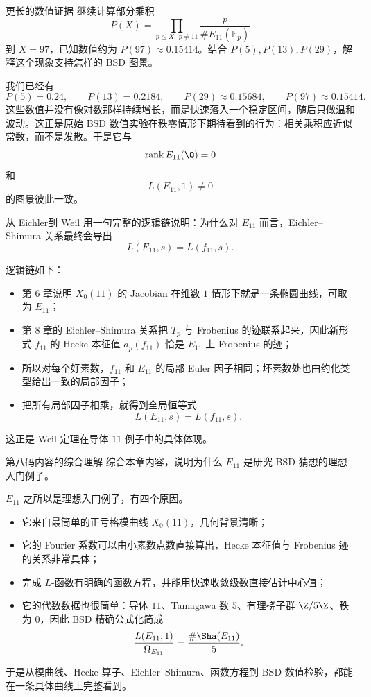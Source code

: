 \begin{problem}{更长的数值证据}
\hard
继续计算部分乘积
\[
P(X)=\prod_{p\le X,\ p\ne11}\frac{p}{\#E_{11}(\mathbb{F}_p)}
\]
到 $X=97$，已知数值约为 $P(97)\approx 0.15414$。结合 $P(5),P(13),P(29)$，解释这个现象支持怎样的 BSD 图景。
\end{problem}
\begin{solution}
我们已经有
\[
P(5)=0.24,
\qquad
P(13)=0.2184,
\qquad
P(29)\approx 0.15684,
\qquad
P(97)\approx 0.15414.
\]
这些数值并没有像对数那样持续增长，而是快速落入一个稳定区间，随后只做温和波动。这正是原始 BSD 数值实验在秩零情形下期待看到的行为：相关乘积应近似常数，而不是发散。于是它与
\[
\operatorname{rank}E_{11}(\Q)=0
\]
和
\[
L(E_{11},1)\ne0
\]
的图景彼此一致。
\end{solution}

\begin{problem}{从 Eichler到 Weil}
\hard
用一句完整的逻辑链说明：为什么对 $E_{11}$ 而言，Eichler--Shimura 关系最终会导出
\[
L(E_{11},s)=L(f_{11},s).
\]
\end{problem}
\begin{solution}
逻辑链如下：
\begin{itemize}
  \item[(i)] 第 6 章说明 $X_0(11)$ 的 Jacobian 在维数 $1$ 情形下就是一条椭圆曲线，可取为 $E_{11}$；
  \item[(ii)] 第 8 章的 Eichler--Shimura 关系把 $T_p$ 与 Frobenius 的迹联系起来，因此新形式 $f_{11}$ 的 Hecke 本征值 $a_p(f_{11})$ 恰是 $E_{11}$ 上 Frobenius 的迹；
  \item[(iii)] 所以对每个好素数，$f_{11}$ 和 $E_{11}$ 的局部 Euler 因子相同；坏素数处也由约化类型给出一致的局部因子；
  \item[(iv)] 把所有局部因子相乘，就得到全局恒等式
  \[
  L(E_{11},s)=L(f_{11},s).
  \]
\end{itemize}
这正是 Weil 定理在导体 $11$ 例子中的具体体现。
\end{solution}

\begin{problem}{第八码内容的综合理解}
\hard
综合本章内容，说明为什么 $E_{11}$ 是研究 BSD 猜想的理想入门例子。
\end{problem}
\begin{solution}
$E_{11}$ 之所以是理想入门例子，有四个原因。
\begin{itemize}
  \item[(i)] 它来自最简单的正亏格模曲线 $X_0(11)$，几何背景清晰；
  \item[(ii)] 它的 Fourier 系数可以由小素数点数直接算出，Hecke 本征值与 Frobenius 迹的关系非常具体；
  \item[(iii)] 完成 $L$-函数有明确的函数方程，并能用快速收敛级数直接估计中心值；
  \item[(iv)] 它的代数数据也很简单：导体 $11$、Tamagawa 数 $5$、有理挠子群 $\Z/5\Z$、秩为 $0$，因此 BSD 精确公式化简成
  \[
  \frac{L(E_{11},1)}{\Omega_{E_{11}}}=\frac{\#\Sha(E_{11})}{5}.
  \]
\end{itemize}
于是从模曲线、Hecke 算子、Eichler--Shimura、函数方程到 BSD 数值检验，都能在一条具体曲线上完整看到。
\end{solution}
